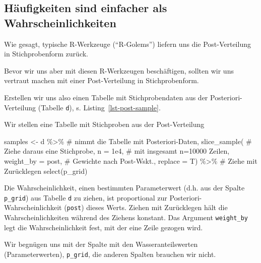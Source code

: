 \documentclass[
  a4paper,
  DIV=11]{scrreprt}
\newenvironment{Shaded}{\begin{snugshade}}{\end{snugshade}}
\newcommand{\AttributeTok}[1]{\textcolor[rgb]{0.40,0.45,0.13}{#1}}
\newcommand{\CommentTok}[1]{\textcolor[rgb]{0.37,0.37,0.37}{#1}}
\newcommand{\FloatTok}[1]{\textcolor[rgb]{0.68,0.00,0.00}{#1}}
\newcommand{\FunctionTok}[1]{\textcolor[rgb]{0.28,0.35,0.67}{#1}}
\newcommand{\NormalTok}[1]{\textcolor[rgb]{0.00,0.23,0.31}{#1}}
\newcommand{\OtherTok}[1]{\textcolor[rgb]{0.00,0.23,0.31}{#1}}
\newcommand{\SpecialCharTok}[1]{\textcolor[rgb]{0.37,0.37,0.37}{#1}}
\theoremstyle{definition}
\theoremstyle{remark}
\begin{document}
\hypertarget{huxe4ufigkeiten-sind-einfacher-als-wahrscheinlichkeiten}{%
\subsection{Häufigkeiten sind einfacher als
Wahrscheinlichkeiten}\label{huxe4ufigkeiten-sind-einfacher-als-wahrscheinlichkeiten}}

Wie gesagt, typische R-Werkzeuge (``R-Golems'') liefern uns die
Post-Verteilung in Stichprobenform zurück.

Bevor wir uns aber mit diesen R-Werkzeugen beschäftigen, sollten wir uns
vertraut machen mit einer Post-Verteilung in Stichprobenform.

Erstellen wir uns also einen Tabelle mit Stichprobendaten aus der
Posteriori-Verteilung (Tabelle \texttt{d}), s.
Listing~\ref{lst-post-sample}.

\begin{codelisting}

\caption{Wir stellen eine Tabelle mit Stichproben aus der
Post-Verteilung}

\hypertarget{lst-post-sample}{%
\label{lst-post-sample}}%
\begin{Shaded}
\begin{Highlighting}[]
\NormalTok{samples }\OtherTok{\textless{}{-}}
\NormalTok{  d }\SpecialCharTok{\%\textgreater{}\%}  \CommentTok{\# nimmt die Tabelle mit Posteriori{-}Daten,}
  \FunctionTok{slice\_sample}\NormalTok{(  }\CommentTok{\# Ziehe daraus eine Stichprobe,}
    \AttributeTok{n =} \FloatTok{1e4}\NormalTok{,  }\CommentTok{\# mit insgesamt n=10000 Zeilen,}
    \AttributeTok{weight\_by =}\NormalTok{ post,  }\CommentTok{\# Gewichte nach Post{-}Wskt.,}
    \AttributeTok{replace =}\NormalTok{ T)  }\SpecialCharTok{\%\textgreater{}\%}  \CommentTok{\# Ziehe mit Zurücklegen}
  \FunctionTok{select}\NormalTok{(p\_grid)}
\end{Highlighting}
\end{Shaded}

\end{codelisting}

Die Wahrscheinlichkeit, einen bestimmten Parameterwert (d.h. aus der
Spalte \texttt{p\_grid}) aus Tabelle \texttt{d} zu ziehen, ist
proportional zur Posteriori-Wahrscheinlichkeit (\texttt{post}) dieses
Werts. Ziehen mit Zurücklegen hält die Wahrscheinlichkeiten während des
Ziehens konstant. Das Argument \texttt{weight\_by} legt die
Wahrscheinlichkeit fest, mit der eine Zeile gezogen wird.

Wir begnügen uns mit der Spalte mit den Wasseranteilswerten
(Parameterwerten), \texttt{p\_grid}, die anderen Spalten brauchen wir
nicht.
\end{document}
